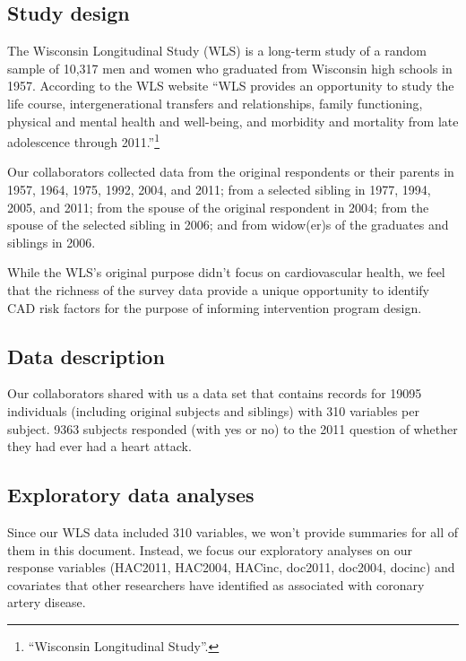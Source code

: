 \documentclass[11pt,]{article}
\let\rmarkdownfootnote\footnote%
\def\footnote{\protect\rmarkdownfootnote}
\begin{document}
\subsection{Study design}\label{study-design}

The Wisconsin Longitudinal Study (WLS) is a long-term study of a random
sample of 10,317 men and women who graduated from Wisconsin high schools
in 1957. According to the WLS website ``WLS provides an opportunity to
study the life course, intergenerational transfers and relationships,
family functioning, physical and mental health and well-being, and
morbidity and mortality from late adolescence through 2011.''\footnote{``Wisconsin
  Longitudinal Study''. }


Our collaborators collected data from the original respondents or their
parents in 1957, 1964, 1975, 1992, 2004, and 2011; from a selected
sibling in 1977, 1994, 2005, and 2011; from the spouse of the original
respondent in 2004; from the spouse of the selected sibling in 2006; and
from widow(er)s of the graduates and siblings in 2006.

While the WLS's original purpose didn't focus on cardiovascular health,
we feel that the richness of the survey data provide a unique
opportunity to identify CAD risk factors for the purpose of informing
intervention program design.

\subsection{Data description}\label{data-description}

Our collaborators shared with us a data set that contains records for
19095 individuals (including original subjects and siblings) with 310
variables per subject. 9363 subjects responded (with yes or no) to the
2011 question of whether they had ever had a heart attack.

\subsection{Exploratory data analyses}\label{exploratory-data-analyses}

Since our WLS data included 310 variables, we won't provide summaries
for all of them in this document. Instead, we focus our exploratory
analyses on our response variables (HAC2011, HAC2004, HACinc, doc2011,
doc2004, docinc) and covariates that other researchers have identified
as associated with coronary artery disease.
\end{document}
